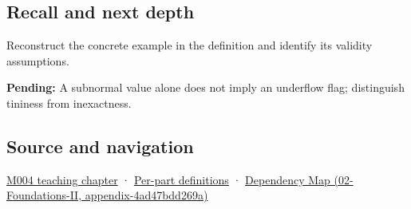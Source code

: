 \subsection{Recall and next depth}\label{appendix-00a6e044c437-recall-and-next-depth}

Reconstruct the concrete example in the definition and identify its validity assumptions.

\textbf{Pending:} A subnormal value alone does not imply an underflow flag; distinguish tininess from inexactness.

\subsection{Source and navigation}\label{appendix-00a6e044c437-source-and-navigation}

\hyperref[01-foundations-i-ch001-a-stretching-ruler-for-real-valued-quantities]{M004 teaching chapter} · \hyperref[appendix-fd090d982a15-m004---parts-61-76]{Per-part definitions} · \href{../02-Foundations-II/main.pdf\#nameddest=appendix-4ad47bdd269a}{Dependency Map (02-Foundations-II, appendix-4ad47bdd269a)}
